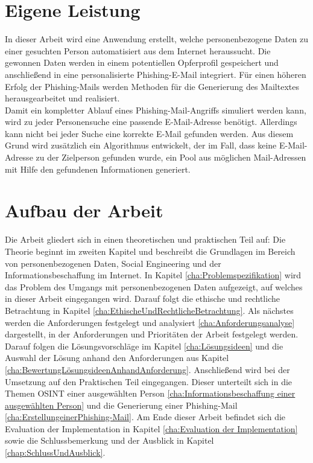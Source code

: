  	
\section{Eigene Leistung}
\label {sec:Eigene Leistung} 
In dieser Arbeit wird eine Anwendung erstellt, welche personenbezogene Daten zu einer gesuchten Person automatisiert aus dem Internet heraussucht. Die gewonnen Daten werden in einem potentiellen Opferprofil gespeichert und anschließend in eine personalisierte Phishing-E-Mail integriert. Für einen höheren Erfolg der Phishing-Mails werden Methoden für die Generierung des Mailtextes herausgearbeitet und realisiert.\\
Damit ein kompletter Ablauf eines Phishing-Mail-Angriffs simuliert werden kann, wird zu jeder Personensuche eine passende E-Mail-Adresse benötigt. Allerdings kann nicht bei jeder Suche eine korrekte E-Mail gefunden werden. Aus diesem Grund wird zusätzlich ein Algorithmus entwickelt, der im Fall, dass keine E-Mail-Adresse zu der Zielperson gefunden wurde, ein Pool aus möglichen Mail-Adressen mit Hilfe den gefundenen Informationen generiert.

\section{Aufbau der Arbeit}
\label {sec:Aufbau der Arbeit} 
Die Arbeit gliedert sich in einen theoretischen und praktischen Teil auf: Die Theorie beginnt im zweiten Kapitel und beschreibt die Grundlagen im Bereich von personenbezogenen Daten, Social Engineering und der Informationsbeschaffung im Internet. In Kapitel \ref{cha:Problemspezifikation} wird das Problem des Umgangs mit personenbezogenen Daten aufgezeigt, auf welches in dieser Arbeit eingegangen wird. Darauf folgt die ethische und rechtliche Betrachtung in Kapitel \ref{cha:EthischeUndRechtlicheBetrachtung}. Als nächstes werden die Anforderungen festgelegt und analysiert \ref{cha:Anforderungsanalyse} dargestellt, in der Anforderungen und Prioritäten der Arbeit festgelegt werden. Darauf folgen die Lösungsvorschläge im Kapitel \ref{cha:Lösungsideen} und die Auswahl der Lösung anhand den Anforderungen aus Kapitel \ref{cha:BewertungLösungsideenAnhandAnforderung}. Anschließend wird bei der Umsetzung auf den Praktischen Teil eingegangen. Dieser unterteilt sich in die Themen OSINT einer ausgewählten Person \ref{cha:Informationsbeschaffung einer ausgewählten Person} und die Generierung einer Phishing-Mail \ref{cha:ErstellungeinerPhishing-Mail}. Am Ende dieser Arbeit befindet sich die Evaluation der Implementation in Kapitel \ref{cha:Evaluation der Implementation} sowie die Schlussbemerkung und der Ausblick in Kapitel \ref{chap:SchlussUndAusblick}.






